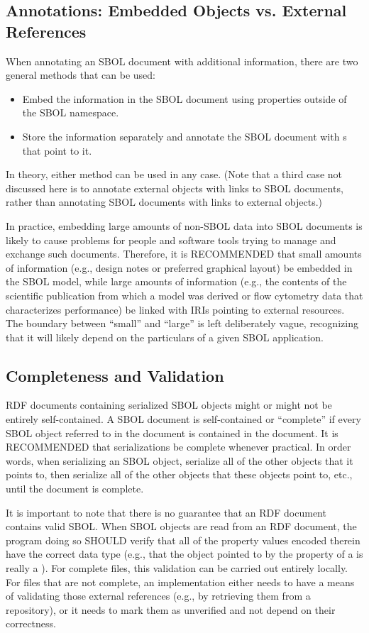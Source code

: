 \subsection{Annotations: Embedded Objects vs. External References}

When annotating an SBOL document with additional information, there are
two general methods that can be used:
\begin{itemize}
\item Embed the information in the SBOL document using properties outside of the SBOL namespace.
\item Store the information separately and annotate the SBOL document with s that point to it.
\end{itemize}
In theory, either method can be used in any case. (Note that a third case not
discussed here is to annotate external objects with links
to SBOL documents, rather than annotating SBOL documents with links to external objects.)

In practice, 
embedding large amounts of non-SBOL data into SBOL documents is likely
to cause problems for people and software tools trying to manage and
exchange such documents.  Therefore, it is RECOMMENDED that small amounts of information (e.g., design notes or preferred graphical layout) be embedded in the SBOL model, while large amounts of information (e.g., the contents of the scientific publication from which a model was derived or flow cytometry data that characterizes performance) be linked with IRIs pointing to external resources.  The boundary between ``small'' and ``large'' is left deliberately vague, recognizing that it will likely depend on the particulars of a given SBOL application.

\subsection{Completeness and Validation}

RDF documents containing serialized SBOL objects might or might not be
entirely self-contained.  A SBOL document is self-contained or ``complete'' if every SBOL object referred to in the document is contained in the document.  It is RECOMMENDED that serializations be complete whenever practical.  In order words, when serializing an SBOL object, serialize all of the other objects that it points to, then serialize all of the other objects that these objects point to, etc., until the document is complete.

It is important to note that there is no guarantee that an RDF document
contains valid SBOL. When SBOL objects are read from an RDF document,
 the program doing so SHOULD verify that all of the property
values encoded therein have the correct data type (e.g., that the object
pointed to by the  property of a
 is really a ).
For complete files, this validation can be carried out entirely locally. For files that are not complete, an implementation either needs to have a means of validating those external references (e.g., by
retrieving them from a repository), or it needs to mark them as
unverified and not depend on their correctness.

